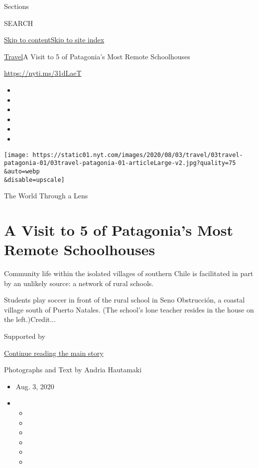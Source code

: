 Sections

SEARCH

\protect\hyperlink{site-content}{Skip to
content}\protect\hyperlink{site-index}{Skip to site index}

\href{/section/travel}{Travel}\textbar{}A Visit to 5 of Patagonia's Most
Remote Schoolhouses

\url{https://nyti.ms/31dLaeT}

\begin{itemize}
\item
\item
\item
\item
\item
\item
\end{itemize}

\texttt{[image: https://static01.nyt.com/images/2020/08/03/travel/03travel-patagonia-01/03travel-patagonia-01-articleLarge-v2.jpg?quality=75\\\&auto=webp\\\&disable=upscale]}

The World Through a Lens

\hypertarget{a-visit-to-5-of-patagonias-most-remote-schoolhouses}{%
\section{A Visit to 5 of Patagonia's Most Remote
Schoolhouses}\label{a-visit-to-5-of-patagonias-most-remote-schoolhouses}}

Community life within the isolated villages of southern Chile is
facilitated in part by an unlikely source: a network of rural schools.

Students play soccer in front of the rural school in Seno Obstrucción, a
coastal village south of Puerto Natales. (The school's lone teacher
resides in the house on the left.)Credit...

Supported by

\protect\hyperlink{after-sponsor}{Continue reading the main story}

Photographs and Text by Andria Hautamaki

\begin{itemize}
\item
  Aug. 3, 2020
\item
  \begin{itemize}
  \item
  \item
  \item
  \item
  \item
  \item
  \end{itemize}
\end{itemize}

